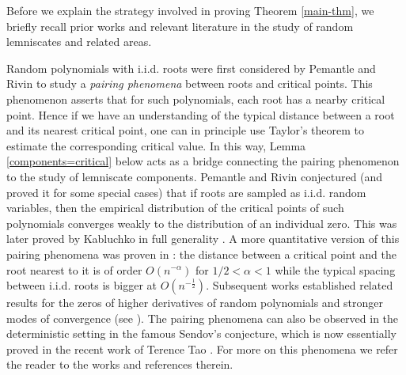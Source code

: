 \documentclass[9pt,a4paper,reqno]{amsart}
\theoremstyle{mine}
\theoremstyle{definition}
\theoremstyle{remark}
\begin{document}
Before we explain the strategy involved in proving Theorem \ref{main-thm}, we briefly recall prior works and relevant literature in the study of random lemniscates and related areas. 

\vspace{0.1in}

\noindent Random polynomials with i.i.d. roots were first considered by Pemantle and Rivin \cite{PemantleRivin} to study a \textit{pairing phenomena} between roots and critical points. This phenomenon asserts that for such polynomials, each root has a nearby critical point. Hence if we have an understanding of the typical distance between a root and its nearest critical point, one can in principle use Taylor's theorem to estimate the corresponding critical value. In this way,  Lemma \ref{components=critical} below acts as a bridge connecting the pairing phenomenon to the study of lemniscate components. Pemantle and Rivin \cite{PemantleRivin} conjectured (and proved it for some special cases) that if roots are sampled as i.i.d. random variables, then the empirical distribution of the critical points of such polynomials converges weakly to the distribution of an individual zero. This was later proved by Kabluchko in full generality \cite{KabluchkoCriticalpointsofrandompolynomia}. A more quantitative version of this pairing phenomena was proven in \cite{Kabluchko-Seidel}: the distance between a critical point and the root nearest to it is of order $O(n^{-\alpha})$ for $1/2< \alpha <1$ while the typical spacing between i.i.d. roots is bigger at $O(n^{-\frac{1}{2}})$. Subsequent works established related results for the zeros of higher derivatives of random polynomials and stronger modes of convergence (see \cites{Angst-Jurgen-Poly-Almostsurebehaviorofthecriticalpointsofrandom, Byun-Sung-Soo-Lee-Reddy-their-higher-derivatives, Michelen-Xuan-Truong-Almostsurebehaviorofthezerosofiteratedderivativesof}).
The pairing phenomena can also be observed in the deterministic setting in the famous Sendov's conjecture, which is now essentially proved in the recent work of Terence Tao \cites{Tao-sendov-conjecture}. For more on this phenomena we refer the reader to the works \cites{HaninBorisPairingofzeros, O'RourkeNoahPairingbetweenzerosandcritical,  O'RourkeNoahOnthelocalpairingbehavior,  Kabluchko-Seidel} and references therein. \\
\end{document}
